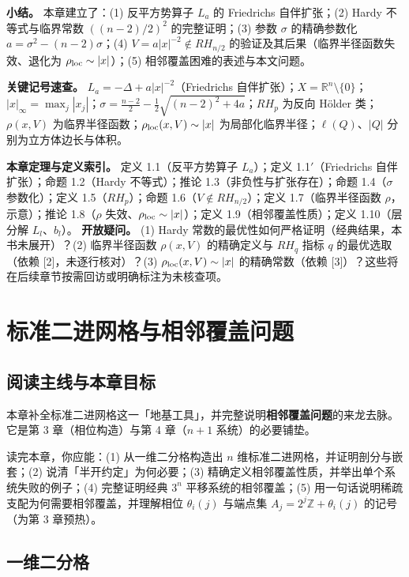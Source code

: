 \documentclass[a4paper,11pt,openany]{ctexbook}
\numberwithin{equation}{chapter}
\numberwithin{figure}{chapter}
\numberwithin{table}{chapter}
\begin{document}
\textbf{小结。} 本章建立了：(1) 反平方势算子 $L_a$ 的 Friedrichs 自伴扩张；(2) Hardy 不等式与临界常数 $((n-2)/2)^2$ 的完整证明；(3) 参数 $\sigma$ 的精确参数化 $a=\sigma^2-(n-2)\sigma$；(4) $V=a|x|^{-2}\notin RH_{n/2}$ 的验证及其后果（临界半径函数失效、退化为 $\rho_{\rm loc}\sim|x|$）；(5) 相邻覆盖困难的表述与本文问题。

\textbf{关键记号速查。} $L_a=-\Delta+a|x|^{-2}$（Friedrichs 自伴扩张）；$X=\mathbb R^n\setminus\{0\}$；$|x|_\infty=\max_j|x_j|$；$\sigma=\frac{n-2}{2}-\frac12\sqrt{(n-2)^2+4a}$；$RH_p$ 为反向 Hölder 类；$\rho(x,V)$ 为临界半径函数；$\rho_{\rm loc}(x,V)\sim|x|$ 为局部化临界半径；$\ell(Q)$、$|Q|$ 分别为立方体边长与体积。



\textbf{本章定理与定义索引。} 定义 1.1（反平方势算子 $L_a$）；定义 1.1$'$（Friedrichs 自伴扩张）；命题 1.2（Hardy 不等式）；推论 1.3（非负性与扩张存在）；命题 1.4（$\sigma$ 参数化）；定义 1.5（$RH_p$）；命题 1.6（$V\notin RH_{n/2}$）；定义 1.7（临界半径函数 $\rho$，示意）；推论 1.8（$\rho$ 失效、$\rho_{\rm loc}\sim|x|$）；定义 1.9（相邻覆盖性质）；定义 1.10（层分解 $L_l$、$b_l$）。
\textbf{开放疑问。} (1) Hardy 常数的最优性如何严格证明（经典结果，本书未展开）？(2) 临界半径函数 $\rho(x,V)$ 的精确定义与 $RH_q$ 指标 $q$ 的最优选取（依赖 [2]，未逐行核对）？(3) $\rho_{\rm loc}(x,V)\sim|x|$ 的精确常数（依赖 [3]）？这些将在后续章节按需回访或明确标注为未核查项。


\clearpage

\chapter{标准二进网格与相邻覆盖问题}
\section{阅读主线与本章目标}

本章补全标准二进网格这一「地基工具」，并完整说明\textbf{相邻覆盖问题}的来龙去脉。它是第 3 章（相位构造）与第 4 章（$n+1$ 系统）的必要铺垫。

读完本章，你应能：(1) 从一维二分格构造出 $n$ 维标准二进网格，并证明剖分与嵌套；(2) 说清「半开约定」为何必要；(3) 精确定义相邻覆盖性质，并举出单个系统失败的例子；(4) 完整证明经典 $3^n$ 平移系统的相邻覆盖；(5) 用一句话说明稀疏支配为何需要相邻覆盖，并理解相位 $\theta_i(j)$ 与端点集 $A_j=2^j\mathbb Z+\theta_i(j)$ 的记号（为第 3 章预热）。

\section{一维二分格}
\end{document}
